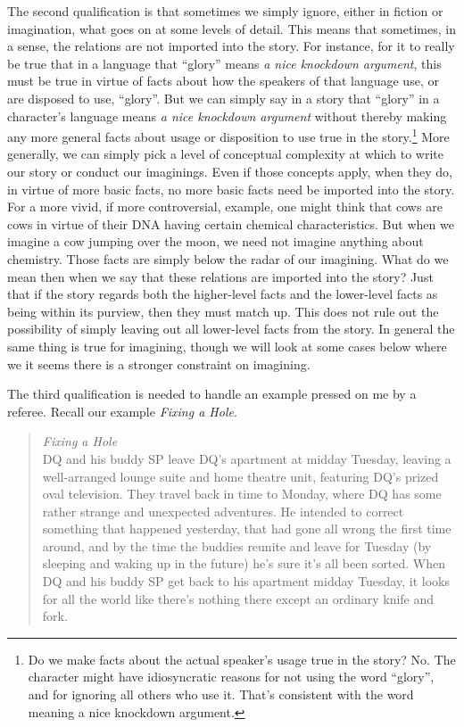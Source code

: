 The second qualification is that sometimes we simply ignore, either in fiction or imagination, what goes on at some levels of detail. This means that sometimes, in a sense, the relations are not imported into the story. For instance, for it to really be true that in a language that ``glory'' means \textit{a nice knockdown argument}, this must be true in virtue of facts about how the speakers of that language use, or are disposed to use, ``glory''. But we can simply say in a story that ``glory'' in a character's language means \textit{a nice knockdown argument} without thereby making any more general facts about usage or disposition to use true in the story.\footnote{Do we make facts about the actual speaker's usage true in the story? No. The character might have idiosyncratic reasons for not using the word ``glory'', and for ignoring all others who use it. That's consistent with the word meaning a nice knockdown argument.} More generally, we can simply pick a level of conceptual complexity at which to write our story or conduct our imaginings. Even if those concepts apply, when they do, in virtue of more basic facts, no more basic facts need be imported into the story. For a more vivid, if more controversial, example, one might think that cows are cows in virtue of their DNA having certain chemical characteristics. But when we imagine a cow jumping over the moon, we need not imagine anything about chemistry. Those facts are simply below the radar of our imagining. What do we mean then when we say that these relations are imported into the story? Just that if the story regards both the higher-level facts and the lower-level facts as being within its purview, then they must match up. This does not rule out the possibility of simply leaving out all lower-level facts from the story. In general the same thing is true for imagining, though we will look at some cases below where we it seems there is a stronger constraint on imagining.

The third qualification is needed to handle an example pressed on me by a referee. Recall our example \textit{Fixing a Hole}.

\begin{quote}
\textit{Fixing a Hole} \\
DQ and his buddy SP leave DQ's apartment at midday Tuesday, leaving a well-arranged lounge suite and home theatre unit, featuring DQ's prized oval television. They travel back in time to Monday, where DQ has some rather strange and unexpected adventures. He intended to correct something that happened yesterday, that had gone all wrong the first time around, and by the time the buddies reunite and leave for Tuesday (by sleeping and waking up in the future) he's sure it's all been sorted. When DQ and his buddy SP get back to his apartment midday Tuesday, it looks for all the world like there's nothing there except an ordinary knife and fork.
\end{quote}

